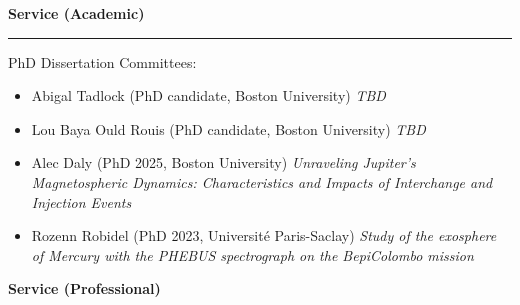 \documentclass[12pt]{report}
\begin{document}
%
%
\vspace{2 mm}
\noindent \bf{Service (Academic)}\rm \hspace*{\fill} \\
\rule{\textwidth}{1pt}
\noindent PhD Dissertation Committees:
\begin{itemize} \itemsep -2pt
	\item Abigal Tadlock (PhD candidate, Boston University) \textit{TBD}
	\item Lou Baya Ould Rouis (PhD candidate, Boston University) \textit{TBD}
	\item Alec Daly (PhD 2025, Boston University) \textit{Unraveling Jupiter's Magnetospheric Dynamics: Characteristics and Impacts of Interchange and Injection Events}
	\item Rozenn Robidel (PhD 2023, Université Paris-Saclay) \textit{Study of the exosphere of Mercury with the PHEBUS spectrograph on the BepiColombo mission}
\end{itemize}
%
\vspace{2 mm}
\noindent\bf{Service (Professional)}\rm \hspace*{\fill} \\
\end{document}
